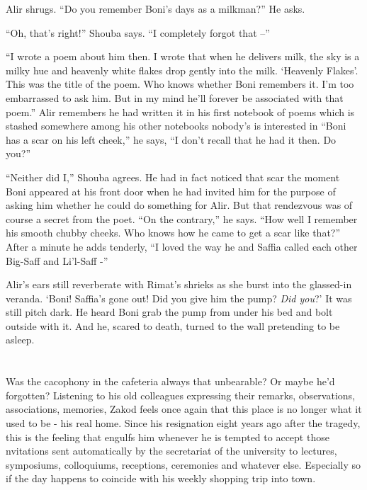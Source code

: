 \documentclass[twoside,11pt]{book}
\begin{document}
Alir shrugs. ``Do you remember Boni's days as a milkman?'' He asks.

``Oh, that's right!'' Shouba says. ``I completely forgot that --''

``I wrote a poem about him then. I wrote that when he delivers milk, the sky is a milky hue and heavenly
white flakes drop gently into the milk. `Heavenly Flakes'. This was the title of the poem. Who knows whether Boni
remembers it. I'm too embarrassed to ask him. But in my mind he'll forever be associated with that poem.''
Alir remembers he had written it in his first notebook of poems which is stashed somewhere among his other notebooks
nobody's is interested in ``Boni has a scar on his left cheek,'' he says, ``I
don't recall that he had it then. Do you?''

``Neither did I,'' Shouba agrees. He had in fact noticed that scar the moment Boni
appeared at his front door when he had invited him for the purpose of asking him whether he could do something for
Alir. But that rendezvous was of course a secret from the poet. ``On the contrary,'' he says.
``How well I remember his smooth chubby cheeks. Who knows how he came to get a scar like
that?'' After a minute he adds tenderly, ``I loved the way he and  Saffia called each other
Big-Saff and Li'l-Saff -''

Alir's ears still reverberate with Rimat's shrieks as she burst into the glassed-in veranda. `Boni! Saffia's gone
out! Did you give him the pump? \textit{Did you}?' It was still pitch dark. He heard Boni grab the pump from under his
bed and bolt outside with it. And he, scared to death, turned to the wall pretending to be asleep.



\chapter{}

Was the cacophony in the cafeteria always that unbearable? Or maybe he'd forgotten?  Listening to his old colleagues
expressing their remarks, observations, associations, memories, Zakod feels once again that this place is no longer
what it used to be -  his real home.  Since his resignation eight years ago after the tragedy, this is the feeling that
engulfs him whenever he is tempted to accept those nvitations sent automatically by the secretariat of the university
to lectures, symposiums, colloquiums, receptions, ceremonies and whatever else. Especially so if the day happens to
coincide with his weekly shopping trip into town.
\end{document}
